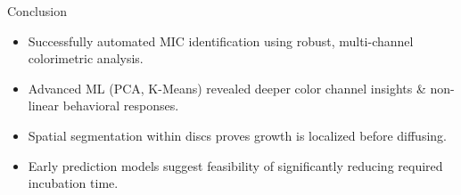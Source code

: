 \documentclass{beamer}
\begin{document}
\begin{frame}{Conclusion}
\begin{itemize}
    \item Successfully automated MIC identification using robust, multi-channel colorimetric analysis.
    \item Advanced ML (PCA, K-Means) revealed deeper color channel insights \& non-linear behavioral responses.
    \item Spatial segmentation within discs proves growth is localized before diffusing.
    \item Early prediction models suggest feasibility of significantly reducing required incubation time.
\end{itemize}
\end{frame}


\end{document}
